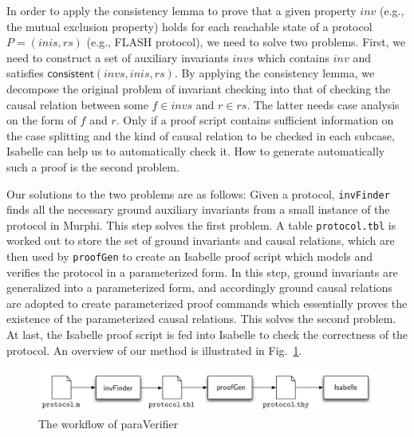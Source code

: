 \documentclass{llncs}
\begin{document}
In order to  apply the consistency lemma to prove that a given property $inv$ (e.g., the mutual exclusion property) holds for each reachable state of a protocol $P=(inis,rs)$ (e.g., FLASH  protocol), we need to solve two problems. First, we need to construct a set of auxiliary invariants $invs$ which contains $inv$ and satisfies  $\mathsf{consistent}( invs, inis, rs)$.  By applying the consistency lemma, we  decompose the original problem of invariant checking into that of checking the causal relation between some $f\in invs$ and $r \in rs$. The latter needs   case analysis on the form of $f$ and $r$.  Only if a proof script contains sufficient information on the case splitting and  the kind of causal relation to be checked in each subcase, Isabelle can help us to automatically  check it. How to  generate automatically such a proof is the second problem.

Our solutions to the two problems are as follows:
Given a protocol,  \texttt{invFinder} finds all the necessary ground auxiliary invariants from a small instance of the protocol in Murphi. This step solves the first  problem.
 A table {\tt protocol.tbl} is worked out  to store the set of ground invariants and
 causal relations, which are then  used by {\tt proofGen} to
create an Isabelle proof   script which models and verifies the
protocol in a parameterized form. In this step, ground invariants
are generalized into a parameterized form, and accordingly
ground causal relations are adopted to create parameterized
proof commands which essentially proves the existence of the
parameterized causal relations. This solves the second problem.  At last, the Isabelle proof script is
fed into Isabelle to check the correctness of the protocol.
An overview of our method is  illustrated in Fig.~\ref{fig:archParaVerifier}.

\vspace{-10pt}
\begin{figure}[htbp]
\centering %
\includegraphics[width=1\textwidth]{paraVerifier.pdf}
\vspace{-20pt}
\caption{The workflow of {\sf paraVerifier} \label{fig:archParaVerifier}
}
\end{figure}
\vspace{-20pt}
\end{document}
